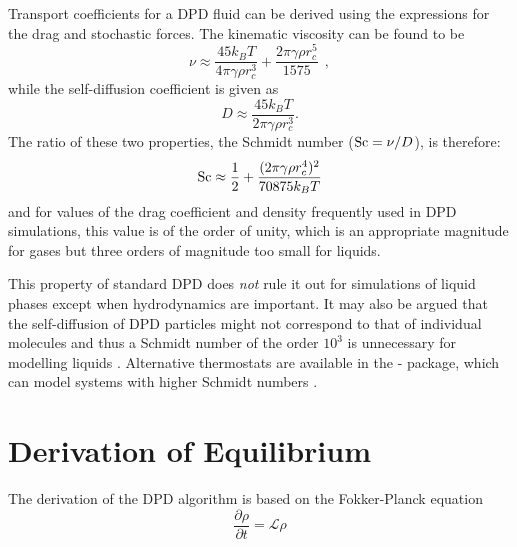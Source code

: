 Transport coefficients for a DPD fluid can be derived using the expressions for
the drag and stochastic forces\cite{groot-97a,koelman-93a,marsh-97a}.
The kinematic viscosity can be found to be
\begin{equation}
\nu \approx \frac{45 k_{B} T}{4 \pi \gamma \rho r_{c}^{3}} + \frac{2 \pi \gamma \rho r_{c}^{5}}{1575}~~,
\end{equation}
while the self-diffusion coefficient is given as
\begin{equation}
D \approx \frac{45 k_{B} T}{2 \pi \gamma \rho r_{c}^{3}}.
\end{equation}
The ratio of these two properties, the Schmidt number ($\textnormal{Sc} = \nu / D$), is therefore:
\begin{equation}
\textnormal{Sc} \approx \frac{1}{2} + \frac{(2 \pi \gamma \rho r_{c}^{4})^{2}}{70875 k_{B} T}
\end{equation}
and for values of the drag coefficient and density frequently used in DPD simulations,
this value is of the order of unity, which is an appropriate magnitude for gases but
three orders of magnitude too small for liquids.

This property of standard DPD does \emph{not} rule it out for simulations of liquid phases
except when hydrodynamics are important.  It may also be argued that the self-diffusion of
DPD particles might not correspond to that of individual molecules and thus a Schmidt number
of the order $10^{3}$ is unnecessary for modelling liquids \cite{peters-04a}.  Alternative
thermostats are available in the \M \cite{seaton-13a} - \WEM{} package, which can
model systems with higher Schmidt numbers \cite{lowe-99a,stoyanov-05a}.

\section{Derivation of Equilibrium}

The derivation of the DPD algorithm is based on the Fokker-Planck equation
\begin{equation}
\frac{\partial \rho}{\partial t} = \mathcal{L} \rho \label{FokkerPlanck}
\end{equation}

